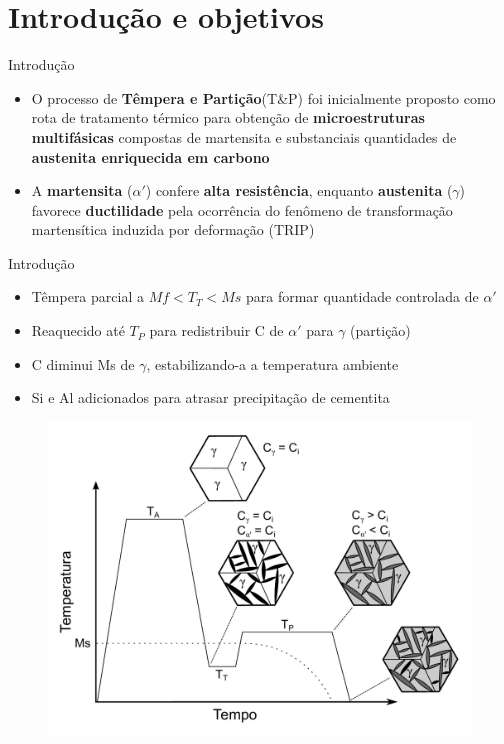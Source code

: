 \section{Introdução e objetivos}

\begin{frame}{Introdução}
  \begin{itemize}
    \item O processo de \textbf{Têmpera e Partição}\footnotemark[1] (T\&P) foi inicialmente proposto como rota de tratamento térmico para obtenção de \textbf{microestruturas multifásicas} compostas de martensita e substanciais quantidades de \textbf{austenita enriquecida em carbono}
    \item A \textbf{martensita} ($\alpha'$) confere \textbf{alta resistência}, enquanto \textbf{austenita} ($\gamma$) favorece \textbf{ductilidade} pela ocorrência do fenômeno de transformação martensítica induzida por deformação (TRIP)
  \end{itemize}

\end{frame}

\begin{frame}{Introdução}
  \begin{itemize}
    \item Têmpera parcial a $Mf < T_T < Ms$ para formar quantidade controlada de $\alpha'$
    \item Reaquecido até $T_P$ para redistribuir C de $\alpha'$ para $\gamma$ (partição)
    \item C diminui Ms de $\gamma$, estabilizando-a a temperatura ambiente
    \item Si e Al adicionados para atrasar precipitação de cementita
  \end{itemize}

  \begin{figure}
    \includegraphics[width=.8\textwidth]{img/Q&P_steel.pdf}
  \end{figure}
\end{frame}

